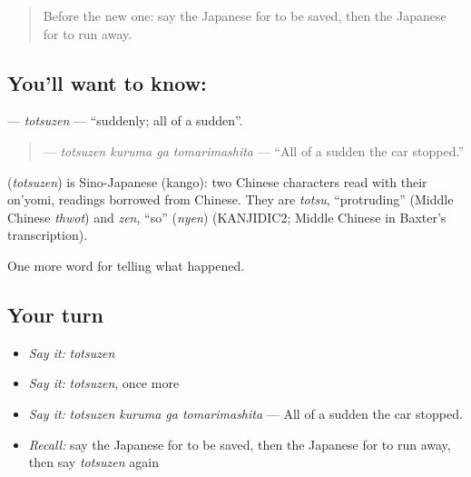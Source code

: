 \label{lesson:JA-C262-totsuzen}



\begin{quote}
Before the new one: say the Japanese for to be saved, then the Japanese for to run away.
\end{quote}

\subsection*{You'll want to know: }
\textbf{} — \emph{totsuzen} — \textquotedblleft{}suddenly; all of a sudden\textquotedblright{}.

\begin{quote}
\textbf{  } — \emph{totsuzen kuruma ga tomarimashita} — \textquotedblleft{}All of a sudden the car stopped.\textquotedblright{}
\end{quote}

\begin{cousinweb}
\textbf{} (\emph{totsuzen}) is Sino-Japanese (kango): two Chinese characters read with their on'yomi, readings borrowed from Chinese. They are \emph{totsu}, \textquotedblleft{}protruding\textquotedblright{} (Middle Chinese \emph{thwot}) and \emph{zen}, \textquotedblleft{}so\textquotedblright{} (\emph{nyen}) (KANJIDIC2; Middle Chinese in Baxter's transcription).
\end{cousinweb}

\begin{grammarlens}[title={What you've built}]
One more word for telling what happened.
\end{grammarlens}

\subsection*{Your turn}
\begin{itemize}
\raggedright
  \item \emph{Say it:} \emph{totsuzen}
  \item \emph{Say it:} \emph{totsuzen}, once more
  \item \emph{Say it:} \emph{totsuzen kuruma ga tomarimashita} — All of a sudden the car stopped.
  \item \emph{Recall:} say the Japanese for to be saved, then the Japanese for to run away, then say \emph{totsuzen} again
\end{itemize}

